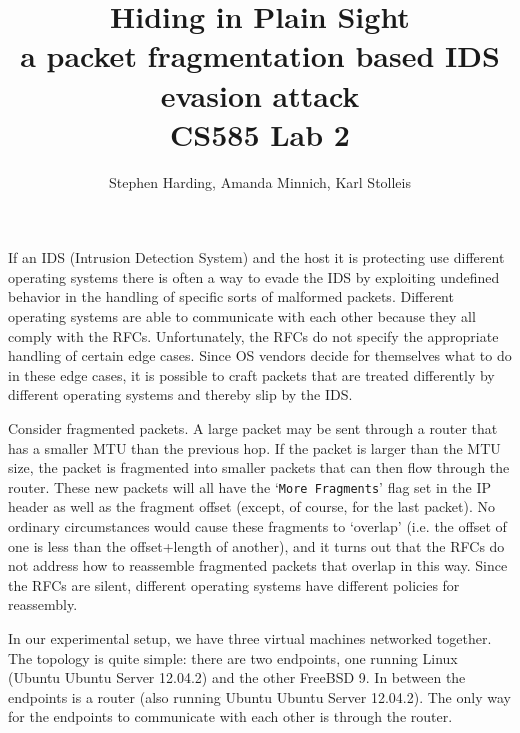 \documentclass[]{article}
\begin{document}
\title{Hiding in Plain Sight \\ 
\Large a packet fragmentation based IDS evasion attack \\
\large CS585 Lab 2}
\author{Stephen Harding, Amanda Minnich, Karl Stolleis}

\maketitle

If an IDS (Intrusion Detection System) and the host it is protecting use different
operating systems there is often a way to evade the IDS by exploiting undefined 
behavior in the handling of specific sorts of malformed packets. Different operating
systems are able to communicate with each other because they all comply with the
RFCs. Unfortunately, the RFCs do not specify the appropriate handling of certain
edge cases. Since OS vendors decide for themselves what to do in these edge cases,
it is possible to craft packets that are treated differently by different operating
systems and thereby slip by the IDS.

Consider fragmented packets. A large packet may be sent through a router that
has a smaller MTU than the previous hop. If the packet is larger than the MTU size,
the packet is fragmented into smaller packets that can then flow through the router.
These new packets will all have the `\texttt{More Fragments}' flag set in the IP
header as well as the fragment offset (except, of course, for the last packet). No 
ordinary circumstances would cause these fragments to `overlap' (i.e. the offset of
one is less than the offset+length of another), and it turns out that the RFCs do
not address how to reassemble fragmented packets that overlap in this way. Since
the RFCs are silent, different operating systems have different policies for
reassembly.

In our experimental setup, we have three virtual machines networked together. The
topology is quite simple: there are two endpoints, one running Linux (Ubuntu Ubuntu 
Server 12.04.2) and the other FreeBSD 9. In between the endpoints is a router
(also running Ubuntu Ubuntu Server 12.04.2). The only way for the endpoints to
communicate with each other is through the router. 
\end{document}
